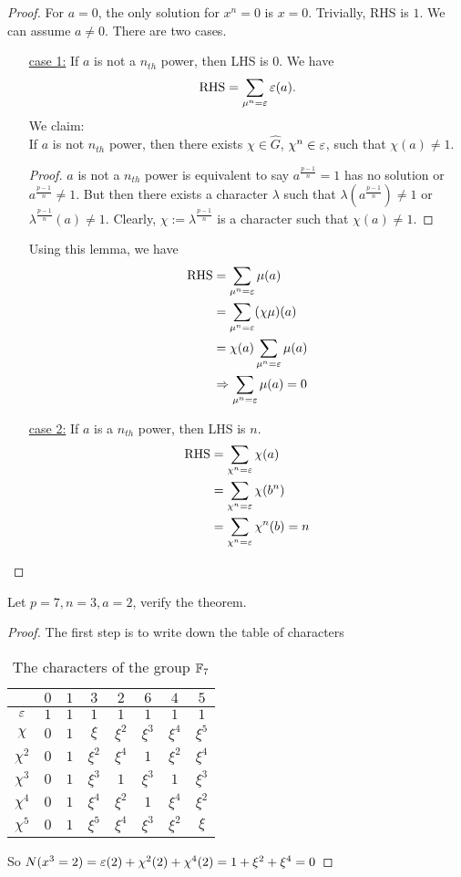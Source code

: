 \begin{proof}
For $a=0$, the only solution for $x^n=0$ is $x=0$. Trivially, RHS is $1$. We can assume $a\ne0$. There are two cases.
\begin{itemize}
	\item[\underline{case 1:}] If $a$ is not a $n_{th}$ power, then LHS is $0$. We have $$
	\mbox{RHS} = \sum_{\mu^n=\varepsilon}\varepsilon(a).$$ We claim:\\
	If $a$ is not $n_{th}$ power, then there exists $\chi\in\hat{G}$, $\chi^n\in\varepsilon$, such that $\chi(a)\ne1$.
	\begin{proof}
	$a$ is not a $n_{th}$ power is equivalent to say $a^{\frac{p-1}{n}}=1$ has no solution or $a^{\frac{p-1}{n}}\ne1$. But then there exists a character $\lambda$ such that $\lambda(a^{\frac{p-1}{n}})\ne1$ or $\lambda^{\frac{p-1}{n}}(a)\ne1$. Clearly, $\chi:=\lambda^{\frac{p-1}{n}}$ is a character such that $\chi(a)\ne1$.
	\end{proof}
	Using this lemma, we have \begin{align*}
	\mbox{RHS} &= \sum_{\mu^n=\varepsilon}\mu(a)\\
	&= \sum_{\mu^n=\varepsilon}(\chi\mu)(a)\\
	&= \chi(a)\sum_{\mu^n=\varepsilon}\mu(a)\\
	&\Rightarrow \sum_{\mu^n=\varepsilon}\mu(a)=0
	\end{align*}
	\item[\underline{case 2:}] If $a$ is a $n_{th}$ power, then LHS is $n$. \begin{align*}
	\mbox{RHS} &=  \sum_{\chi^n=\varepsilon}\chi(a)\\
	&=\sum_{\chi^n=\varepsilon}\chi(b^n)\\
	&=\sum_{\chi^n=\varepsilon}\chi^n(b)=n
	\end{align*}
\end{itemize}
\end{proof}
\begin{example}
Let $p=7,n=3, a=2$, verify the theorem.
\end{example}
\begin{proof}
The first step is to write down the table of characters
\begin{table}[htbp]
\centering
\begin{tabular}{c|ccccccc}
          & $0$ & $1$  & $3$     & $2$     & $6$ & $4$ & $5$ \\\hline
  $\varepsilon$     & $1$& $1$  & $1$     & $1$     & $1$ & $1$ & $1$\\
  $\chi$  & $0$& $1$  & $\xi$   & $\xi^2$ & $\xi^3$ & $\xi^4$ & $\xi^5$\\
  $\chi^2$& $0$& $1$  & $\xi^2$ & $\xi^4$ & $1$ & $\xi^2$ & $\xi^4$\\
  $\chi^3$& $0$& $1$  & $\xi^3$ & $1$     & $\xi^3$ & $1$ & $\xi^3$\\
  $\chi^4$& $0$& $1$  & $\xi^4$ & $\xi^2$ & $1$ & $\xi^4$ & $\xi^2$\\
  $\chi^5$& $0$& $1$  & $\xi^5$ & $\xi^4$ & $\xi^3$ & $\xi^2$ & $\xi$\\
\end{tabular}
\caption{The characters of the group $\mathbb{F}_7$\label{char7}}
\end{table}
So $N(x^3=2)=\varepsilon(2)+\chi^2(2)+\chi^4(2)=1+\xi^2+\xi^4 = 0$
\end{proof}

